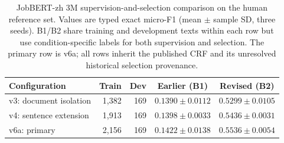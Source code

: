 \begin{table}[H]
\caption{JobBERT-zh 3M supervision-and-selection comparison on the human reference set. Values are typed exact micro-F1 (mean $\pm$ sample SD, three seeds). B1/B2 share training and development texts within each row but use condition-specific labels for both supervision and selection. The primary row is v6a; all rows inherit the published CRF and its unresolved historical selection provenance.}
\label{tab:jobbert-pool-stage2}
\centering
\small
\begin{tabular}{@{}lrrcc@{}}
\toprule
Configuration & Train & Dev & Earlier (B1) & Revised (B2) \\
\midrule
v3: document isolation & 1,382 & 169 & $0.1390\pm0.0112$ & $0.5299\pm0.0105$ \\
v4: sentence extension & 1,913 & 169 & $0.1398\pm0.0033$ & $0.5436\pm0.0031$ \\
v6a: primary & 2,156 & 169 & $0.1422\pm0.0138$ & $\mathbf{0.5536\pm0.0054}$ \\
\bottomrule
\end{tabular}
\end{table}
